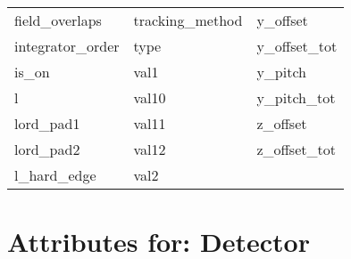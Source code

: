 \begin{tabular}{lll}
field_overlaps              & tracking_method             & y_offset                    \\
integrator_order            & type                        & y_offset_tot                \\
is_on                       & val1                        & y_pitch                     \\
l                           & val10                       & y_pitch_tot                 \\
lord_pad1                   & val11                       & z_offset                    \\
lord_pad2                   & val12                       & z_offset_tot                \\
l_hard_edge                 & val2                        &                             \\
 \bottomrule
 \end{tabular}
 \vfill
 
 \section{Attributes for: Detector}
 \label{s:list.detector}
 
